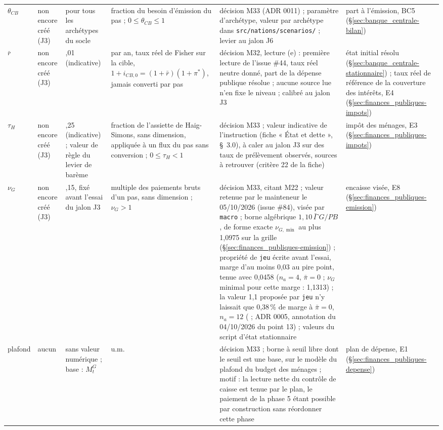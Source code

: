 \documentclass[11pt,a4paper]{article}
\newcommand{\barre}[1]{\leavevmode\sbox{\boitebarre}{#1}\rlap{\rule[0.6ex]{\wd\boitebarre}{0.4pt}}\usebox{\boitebarre}}
\begin{document}
\begin{center}
\begin{longtable}{p{1.5cm}>{\raggedright\arraybackslash}p{3.0cm}>{\raggedright\arraybackslash}p{1.4cm}>{\raggedright\arraybackslash}p{1.8cm}>{\raggedright\arraybackslash}p{3.4cm}>{\raggedright\arraybackslash}p{2.6cm}}
$\theta_{\mathit{CB}}$ & non encore créé (J3) & 0 pour tous les archétypes du socle & fraction du besoin d'émission du pas ; $0 \le \theta_{\mathit{CB}} \le 1$ & décision M33 (ADR 0011) ; paramètre d'archétype, valeur par archétype dans \nolinkurl{src/nations/scenarios/} ; levier au jalon J6 & part à l'émission, BC5 (\S\ref{sec:banque_centrale-bilan})\\
$\bar r$ & non encore créé (J3) & 0,01 (indicative) & par an, taux réel de Fisher sur la cible, $1 + i_{\mathit{CB},0} = (1 + \bar r)(1 + \pi^\ast)$, jamais converti par pas & décision M32, lecture (e) : première lecture de l'issue \#44, taux réel neutre donné, part de la dépense publique résolue ; aucune source lue n'en fixe le niveau ; calibré au jalon J3 & état initial résolu (\S\ref{sec:banque_centrale-stationnaire}) ; taux réel de référence de la couverture des intérêts, E4 (\S\ref{sec:finances_publiques-impots})\\
$\tau_H$ & non encore créé (J3) & 0,25 (indicative) ; valeur de règle du levier de barème & fraction de l'assiette de Haig-Simons, sans dimension, appliquée à un flux du pas sans conversion ; $0 \le \tau_H < 1$ & décision M33 ; valeur indicative de l'instruction (fiche « État et dette », \S~3.0), à caler au jalon J3 sur des taux de prélèvement observés, sources à retrouver (critère 22 de la fiche) & impôt des ménages, E3 (\S\ref{sec:finances_publiques-impots})\\
$\nu_G$ & non encore créé (J3) & 1,15, fixé avant l'essai du jalon J3 & multiple des paiements bruts d'un pas, sans dimension ; $\nu_G > 1$ & décision M33, citant M22 ; valeur retenue par le mainteneur le 05/10/2026 (issue \#84), visée par \texttt{macro} ; borne algébrique $1{,}10\,\bar\Gamma\,G/\mathit{PB}$, de forme exacte $\nu_{G,\min}$ au plus 1,0975 sur la grille (\S\ref{sec:finances_publiques-emission}) ; propriété de \texttt{jeu} écrite avant l'essai, marge d'au moins 0,03 au pire point, tenue avec 0,0458 ($n_a = 4$, $\bar\pi = 0$ ; $\nu_G$ minimal pour cette marge : 1,1313) ; la valeur 1,1 proposée par \texttt{jeu} n'y laissait que 0,38\,\% de marge à $\bar\pi = 0$, $n_a = 12$ (\barre{0,37\,\%} ; ADR 0005, annotation du 04/10/2026 du point 13) ; valeurs du script d'état stationnaire & encaisse visée, E8 (\S\ref{sec:finances_publiques-emission})\\
plafond & aucun & sans valeur numérique ; base : $M^G_t$ & u.m. & décision M33 ; borne à seuil libre dont le seuil est une base, sur le modèle du plafond du budget des ménages ; motif : la lecture nette du contrôle de caisse est tenue par le plan, le paiement de la phase 5 étant possible par construction sans réordonner cette phase & plan de dépense, E1 (\S\ref{sec:finances_publiques-depense})\\
\bottomrule
\end{longtable}
\end{center}
\end{document}
